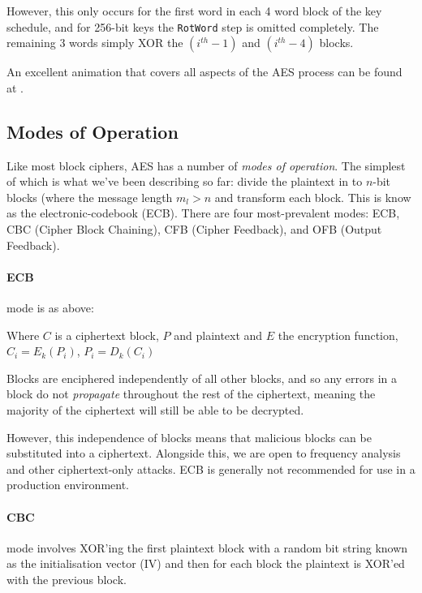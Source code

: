     However, this only occurs for the first word in each 4 word block of the key schedule, and for 256-bit keys the \verb!RotWord! step is omitted completely. The remaining 3 words simply XOR the $(i^{th}-1)$ and $(i^{th}-4)$ blocks.
    
    An excellent animation that covers all aspects of the AES process can be found at \cite{Straubing:2005aa}.
  
  \subsection{Modes of Operation}
  
  Like most block ciphers, AES has a number of \emph{modes of operation}. The simplest of which is what we've been describing so far: divide the plaintext in to $n$-bit blocks (where the message length $m_l > n$ and transform each block. This is know as the electronic-codebook (ECB). There are four most-prevalent modes: ECB, CBC (Cipher Block Chaining), CFB (Cipher Feedback), and OFB (Output Feedback).
  
  \paragraph{ECB} mode is as above:
    
  \begin{center}
    Where $C$ is a ciphertext block, $P$ and plaintext and $E$ the encryption function, 
    $C_i = E_k(P_i)$, $P_i = D_k(C_i)$
  \end{center}
  
  Blocks are enciphered independently of all other blocks, and so any errors in a block do not \emph{propagate} throughout the rest of the ciphertext, meaning the majority of the ciphertext will still be able to be decrypted.
  
  However, this independence of blocks means that malicious blocks can be substituted into a ciphertext. Alongside this, we are open to frequency analysis and other ciphertext-only attacks. ECB is generally not recommended for use in a production environment.
  
  \paragraph{CBC} mode involves XOR'ing the first plaintext block with a random bit string known as the initialisation vector (IV) and then for each block the plaintext is XOR'ed with the previous block.
  
